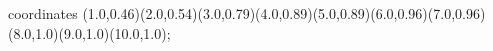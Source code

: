 					coordinates { (1.0,0.46)(2.0,0.54)(3.0,0.79)(4.0,0.89)(5.0,0.89)(6.0,0.96)(7.0,0.96)(8.0,1.0)(9.0,1.0)(10.0,1.0)};